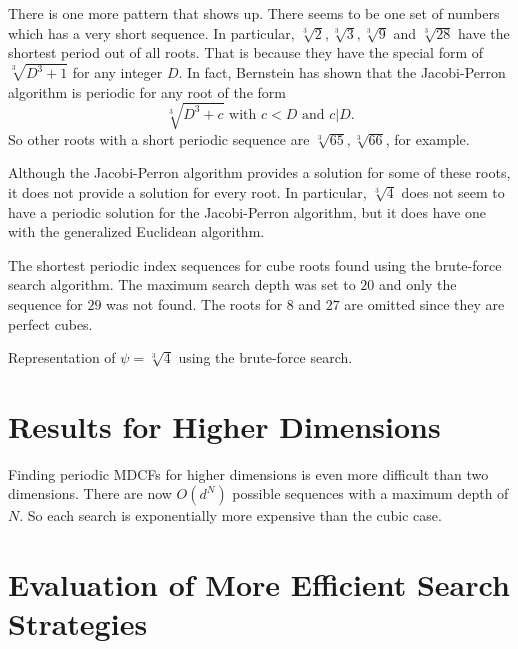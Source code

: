 There is one more pattern that shows up.
There seems to be one set of numbers which has a very short sequence.
In particular, $\sqrt[3]{2}, \sqrt[3]{3}, \sqrt[3]{9}$ and $\sqrt[3]{28}$ have
the shortest period out of all roots.
That is because they have the special form of $\sqrt[3]{D^3 + 1}$ for any integer $D$.
In fact, Bernstein \cite{Bernstein71} has shown that the Jacobi-Perron
algorithm is periodic for any root of the form
\[
  \sqrt[3]{D^3 + c} \text{ with } c < D \text{ and } c|D.
\]
So other roots with a short periodic sequence are $\sqrt[3]{65}, \sqrt[3]{66}$,
for example.

Although the Jacobi-Perron algorithm provides a solution for some of these
roots, it does not provide a solution for every root.
In particular, $\sqrt[3]{4}$ does not seem to have a periodic solution for the
Jacobi-Perron algorithm, but it does have one with the generalized Euclidean
algorithm.

\begin{table}[t]
  \caption{
    The shortest periodic index sequences for cube roots found using the
    brute-force search algorithm. The maximum search depth was set to $20$ and
    only the sequence for $29$ was not found. The roots for $8$ and $27$ are
    omitted since they are perfect cubes.}
  \label{tbl:cubics}
  \centering
  
\end{table}

\begin{table}[t]
  \caption{Representation of $ψ = \sqrt[3]{4}$ using the brute-force search.}
  \label{table:cube-root-4}
  \centering
  
\end{table}

\section{Results for Higher Dimensions}

Finding periodic MDCFs for higher dimensions is even more difficult than two dimensions.
There are now $O(d^N)$ possible sequences with a maximum depth of $N$.
So each search is exponentially more expensive than the cubic case.

\section{Evaluation of More Efficient Search Strategies}

